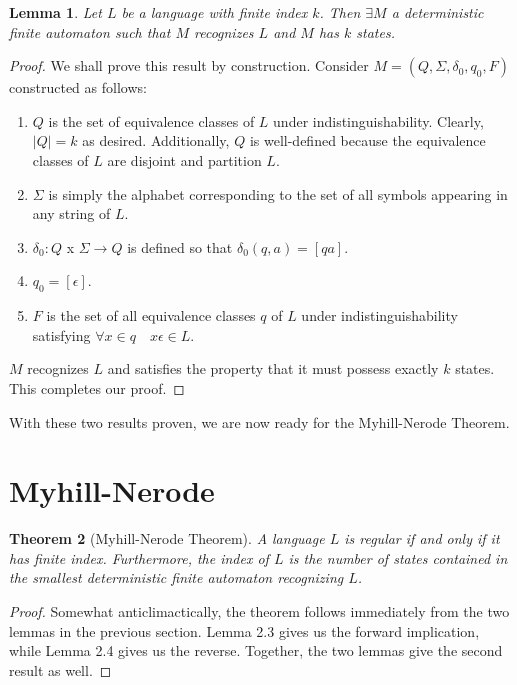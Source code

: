 \documentclass[12pt]{article}
\newtheorem{theorem}{Theorem}[section]
\newtheorem{lemma}[theorem]{Lemma}
\theoremstyle{definition}
\theoremstyle{remark}
\begin{document}
\begin{lemma}
Let $L$ be a language with finite index $k$. Then $\exists M$ a deterministic finite automaton such that $M$ recognizes $L$ and $M$ has $k$ states.
\end{lemma}

\begin{proof}
We shall prove this result by construction. Consider $M=(Q,\Sigma,\delta_0,q_0,F)$ constructed as follows:
\begin{enumerate}
	\item{$Q$ is the set of equivalence classes of $L$ under indistinguishability. Clearly, $|Q| = k$ as desired. Additionally, $Q$ is well-defined because the equivalence classes of $L$ are disjoint and partition $L$.}
	\item{$\Sigma$ is simply the alphabet corresponding to the set of all symbols appearing in any string of $L$.}
	\item{$\delta_0:Q$ x $\Sigma \rightarrow Q$ is defined so that $\delta_0(q,a) = [qa]$.}
	\item{$q_0 = [ \epsilon ]$.}
	\item{$F$ is the set of all equivalence classes $q$ of $L$ under indistinguishability satisfying $\forall x \in q \quad x\epsilon \in L$.}
\end{enumerate}

$M$ recognizes $L$ and satisfies the property that it must possess exactly $k$ states. This completes our proof.
\end{proof}

With these two results proven, we are now ready for the Myhill-Nerode Theorem.

\section{Myhill-Nerode}

\begin{theorem}[Myhill-Nerode Theorem]
A language $L$ is regular if and only if it has finite index. Furthermore, the index of $L$ is the number of states contained in the smallest deterministic finite automaton recognizing $L$.
\end{theorem}

\begin{proof}
Somewhat anticlimactically, the theorem follows immediately from the two lemmas in the previous section. Lemma 2.3 gives us the forward implication, while Lemma 2.4 gives us the reverse. Together, the two lemmas give the second result as well.
\end{proof}
\end{document}
